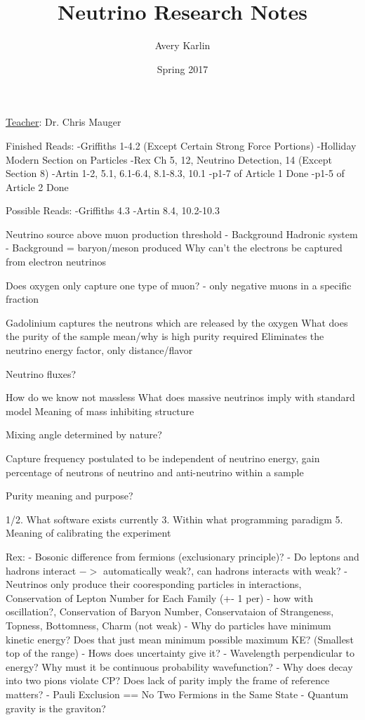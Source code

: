 \documentclass[11 pt, twoside]{article}
\begin{document}
\title{Neutrino Research Notes}
\author{Avery Karlin}
\date{Spring 2017}
\newcommand{\teacher}{Dr. Chris Mauger}

\maketitle
\newpage
\hypertarget{content}{\tableofcontents}
\vspace{11pt}
\noindent
\underline{Teacher}: \teacher
\newpage

Finished Reads: 
	-Griffiths 1-4.2 (Except Certain Strong Force Portions)
	-Holliday Modern Section on Particles
	-Rex Ch 5, 12, Neutrino Detection, 14 (Except Section 8)
	-Artin 1-2, 5.1, 6.1-6.4, 8.1-8.3, 10.1
	-p1-7 of Article 1 Done
	-p1-5 of Article 2 Done

Possible Reads:
	-Griffiths 4.3
	-Artin 8.4, 10.2-10.3

Neutrino source above muon production threshold - Background
Hadronic system - Background = baryon/meson produced
Why can't the electrons be captured from electron neutrinos

Does oxygen only capture one type of muon? - only negative muons in a specific fraction

Gadolinium captures the neutrons which are released by the oxygen
What does the purity of the sample mean/why is high purity required
Eliminates the neutrino energy factor, only distance/flavor

Neutrino fluxes?

How do we know not massless
What does massive neutrinos imply with standard model
Meaning of mass inhibiting structure

Mixing angle determined by nature?

Capture frequency postulated to be independent of neutrino energy, gain percentage of neutrons of neutrino and anti-neutrino within a sample

Purity meaning and purpose?

1/2. What software exists currently
3. Within what programming paradigm
5. Meaning of calibrating the experiment

Rex:
- Bosonic difference from fermions (exclusionary principle)?
- Do leptons and hadrons interact $->$ automatically weak?, can hadrons interacts with weak?
- Neutrinos only produce their cooresponding particles in interactions, Conservation of Lepton Number for Each Family (+- 1 per) - how with oscillation?, Conservation of Baryon Number, Conservataion of Strangeness, Topness, Bottomness, Charm (not weak)
- Why do particles have minimum kinetic energy? Does that just mean minimum possible maximum KE? (Smallest top of the range) - Hows does uncertainty give it?
- Wavelength perpendicular to energy? Why must it be continuous probability wavefunction?
- Why does decay into two pions violate CP? Does lack of parity imply the frame of reference matters?
- Pauli Exclusion == No Two Fermions in the Same State
- Quantum gravity is the graviton?
\end{document}
